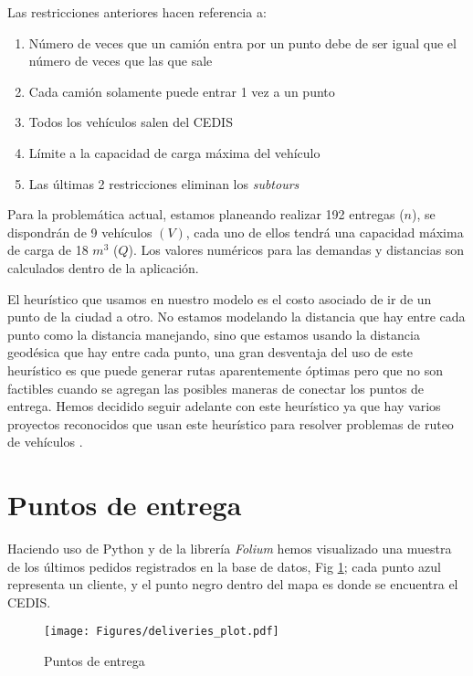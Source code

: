 \documentclass[journal]{IEEEtran}                                                          %
\begin{document}
        Las restricciones anteriores hacen referencia a:
        \begin{enumerate}
            \item Número de veces que un camión entra por un punto debe de ser igual que el número de veces que las que sale
            \item Cada camión solamente puede entrar 1 vez a un punto
            \item Todos los vehículos salen del CEDIS
            \item Límite a la capacidad de carga máxima del vehículo
            \item Las últimas 2 restricciones eliminan los \emph{subtours}
        \end{enumerate}
        
        Para la problemática actual, estamos planeando realizar 192 entregas ($n$), se dispondrán de 9 vehículos $(V)$, cada uno de ellos tendrá una capacidad máxima de carga de 18 $m^3$ ($Q$). Los valores numéricos para las demandas y distancias son calculados dentro de la aplicación.
        
        El heurístico que usamos en nuestro modelo es el costo asociado de ir de un punto de la ciudad a otro. No estamos modelando la distancia que hay entre cada punto como la distancia manejando, sino que estamos usando la distancia geodésica que hay entre cada punto, una gran desventaja del uso de este heurístico es que puede generar rutas aparentemente óptimas pero que no son factibles cuando se agregan las posibles maneras de conectar los puntos de entrega. Hemos decidido seguir adelante con este heurístico ya que hay varios proyectos reconocidos que usan este heurístico para resolver problemas de ruteo de vehículos \cite{ERDOGAN201762}.
    
    \section{Puntos de entrega}
        
        Haciendo uso de Python y de la librería \emph{Folium} hemos visualizado una muestra de los últimos pedidos registrados en la base de datos, Fig \ref{puntos-entrega-mapa}; cada punto azul representa un cliente, y el punto negro dentro del mapa es donde se encuentra el CEDIS.
        
        \begin{figure}[!ht]
            \centering
            \texttt{[image: Figures/deliveries\_plot.pdf]}
            \caption{Puntos de entrega} 
            \label{puntos-entrega-mapa}
        \end{figure}
        
\end{document}
